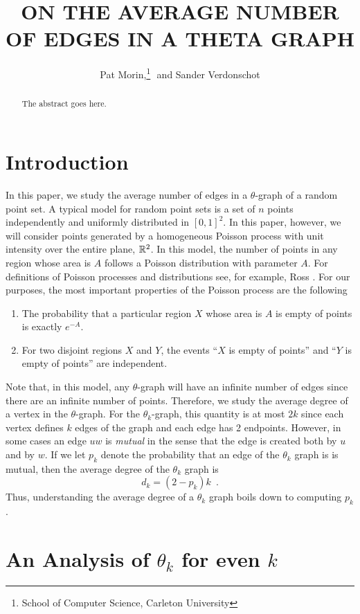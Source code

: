 \documentclass{patmorin}
\title{\MakeUppercase{On the Average Number of Edges in a Theta Graph}}
\author{Pat Morin,\thanks{School of Computer Science, Carleton University}\,\,
         and Sander Verdonschot\footnotemark[1]}
\begin{document}
\maketitle

\begin{abstract}
  The abstract goes here.
\end{abstract}

\section{Introduction}

In this paper, we study the average number of edges in a $\theta$-graph
of a random point set.  A typical model for random point sets is a set
of $n$ points independently and uniformly distributed in $[0,1]^2$.
In this paper, however, we will consider points generated by a
homogeneous Poisson process with unit intensity over the entire
plane, $\mathbb{R}^2$.  In this model, the number of points in any region
whose area is $A$ follows a Poisson distribution with parameter $A$.
For definitions of Poisson processes and distributions see, for example,
Ross \cite[Chapter~2]{ross:introduction}.  For our purposes, the most
important properties of the Poisson process are the following
\begin{enumerate}
\item The probability  that a particular region $X$ whose area is $A$
   is empty of points is exactly $e^{-A}$.
\item For two disjoint regions $X$ and $Y$, the events ``$X$ is empty
   of points'' and ``$Y$ is empty of points'' are independent.
\end{enumerate}
Note that, in this model, any $\theta$-graph will have an infinite number
of edges since there are an infinite number of points.  Therefore,
we study the average degree of a vertex in the $\theta$-graph.  For the
$\theta_k$-graph, this quantity is at most $2k$ since each vertex defines
$k$ edges of the graph and each edge has 2 endpoints.  However, in some
cases an edge $uw$ is \emph{mutual} in the sense that the edge is created
both by $u$ and by $w$.  If we let $p_k$ denote the probability that an
edge of the $\theta_k$ graph is is mutual, then the average degree of
the $\theta_k$ graph is
\[
    d_k = (2-p_k)k \enspace .
\]
Thus, understanding the average degree of a $\theta_k$ graph boils down
to computing $p_k$.

\section{An Analysis of $\theta_k$ for even $k$}
\end{document}
